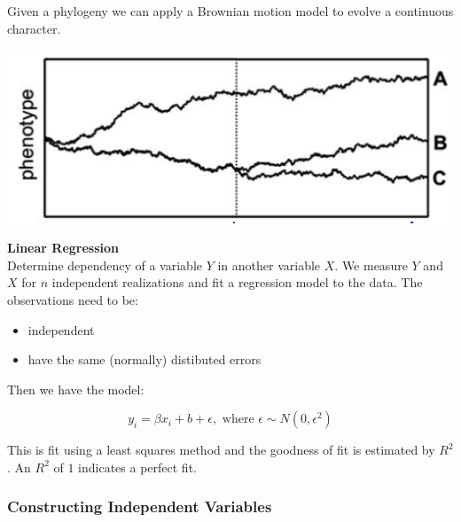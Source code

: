 \documentclass{article}
\begin{document}
\begin{multicols*}{3}
Given a phylogeny we can apply a Brownian motion model to evolve a continuous character. 

\begin{center}
    \includegraphics[width=1\linewidth, angle=0.0]{brownphyl.png}
\end{center}

\begin{mdframed}[backgroundcolor=astral] 
    \textbf{Linear Regression}\\
    Determine dependency of a variable $Y$ in another variable $X$. We measure $Y$ and $X$ for $n$ independent realizations and fit a regression model to the data. The observations need to be:
    \begin{itemize}
        \item independent
        \item have the same (normally) distibuted errors
    \end{itemize}
    
    Then we have the model: 
    
    $$y_i = \beta x_i + b + \epsilon, \text{ where } \epsilon \sim N(0, \epsilon^2)$$
    
    This is fit using a least squares method and the goodness of fit is estimated by $R^2$. An $R^2$ of $1$ indicates a perfect fit. 
\end{mdframed}

\subsubsection{Constructing Independent Variables}


\end{multicols*}
\end{document}
